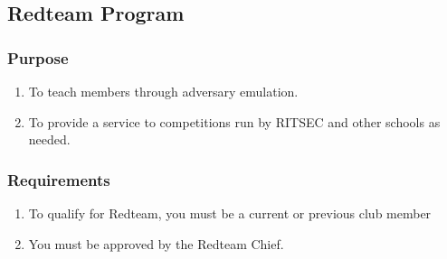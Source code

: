 \subsection{Redteam Program}

\subsubsection{Purpose}

\begin{enumerate}
  \item To teach members through adversary emulation.
  \item To provide a service to competitions run by RITSEC and other schools as
    needed.
\end{enumerate}

\subsubsection{Requirements}

\begin{enumerate}
  \item To qualify for Redteam, you must be a current or previous club member
  \item You must be approved by the Redteam Chief.
\end{enumerate}